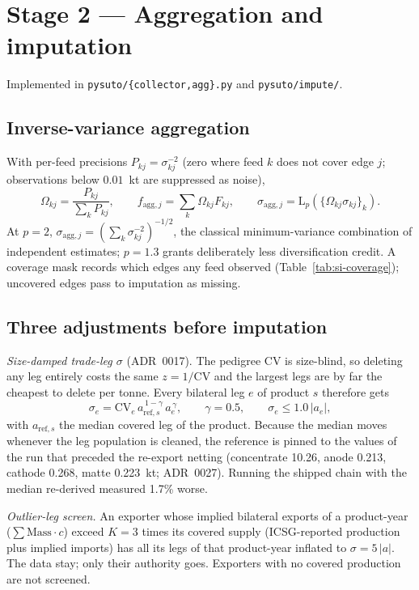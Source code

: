 \documentclass[11pt]{article}
\newcommand{\Lp}[1]{\mathrm{L}_p\!\left(#1\right)}
\begin{document}
\section{Stage 2 --- Aggregation and imputation}\label{si:stage2}
Implemented in \texttt{pysuto/\{collector,agg\}.py} and \texttt{pysuto/impute/}.

\subsection{Inverse-variance aggregation}
With per-feed precisions $P_{kj} = \sigma_{kj}^{-2}$ (zero where feed $k$ does
not cover edge $j$; observations below $0.01$~kt are suppressed as noise),
\begin{equation}
\Omega_{kj} = \frac{P_{kj}}{\sum_k P_{kj}}, \qquad
f_{\mathrm{agg},j} = \sum_k \Omega_{kj} F_{kj}, \qquad
\sigma_{\mathrm{agg},j} = \Lp{\{\Omega_{kj}\sigma_{kj}\}_k}.
\label{eq:si-agg}
\end{equation}
At $p=2$, $\sigma_{\mathrm{agg},j} = (\sum_k \sigma_{kj}^{-2})^{-1/2}$, the
classical minimum-variance combination of independent estimates; $p=1.3$
grants deliberately less diversification credit. A coverage mask records
which edges any feed observed (Table~\ref{tab:si-coverage}); uncovered
edges pass to imputation as missing.

\subsection{Three adjustments before imputation}
\emph{Size-damped trade-leg $\sigma$} (ADR~0017). The pedigree CV is
size-blind, so deleting any leg entirely costs the same $z = 1/\mathrm{CV}$
and the largest legs are by far the cheapest to delete per tonne. Every
bilateral leg $e$ of product $s$ therefore gets
\begin{equation}
\sigma_e = \mathrm{CV}_e\, a_{\mathrm{ref},s}^{\,1-\gamma}\, a_e^{\,\gamma},
\qquad \gamma = 0.5,\qquad \sigma_e \le 1.0\,|a_e|,
\end{equation}
with $a_{\mathrm{ref},s}$ the median covered leg of the product. Because the
median moves whenever the leg population is cleaned, the reference is pinned
to the values of the run that preceded the re-export netting (concentrate
10.26, anode 0.213, cathode 0.268, matte 0.223~kt; ADR~0027). Running the
shipped chain with the median re-derived measured 1.7\% worse.

\emph{Outlier-leg screen.} An exporter whose implied bilateral exports of a
product-year ($\sum \mathrm{Mass}\cdot c$) exceed $K = 3$ times its covered
supply (ICSG-reported production plus implied imports) has all its legs of
that product-year inflated to $\sigma = 5\,|a|$. The data stay; only their
authority goes. Exporters with no covered production are not screened.
\end{document}
